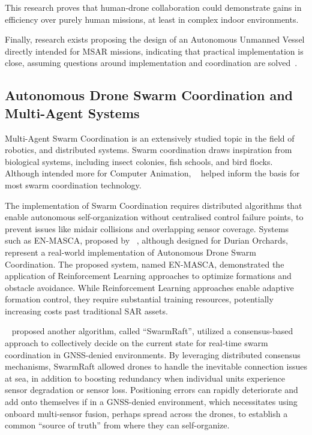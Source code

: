 This research proves that human-drone collaboration could demonstrate gains in efficiency over purely human missions, at least in complex indoor environments.

Finally, research exists proposing the design of an Autonomous Unmanned Vessel directly intended for MSAR missions, indicating that practical implementation is close, assuming questions around implementation and coordination are solved~\cite{AUV_Proposal}.

\subsection{Autonomous Drone Swarm Coordination and Multi-Agent Systems}\label{subsec:autonomous-drone-swarm-coordination-and-multi-agent-systems}
Multi-Agent Swarm Coordination is an extensively studied topic in the field of robotics, and distributed systems.
Swarm coordination draws inspiration from biological systems, including insect colonies, fish schools, and bird flocks.
Although intended more for Computer Animation, ~\cite{10.1145/37402.37406} helped inform the basis for most swarm coordination technology.

The implementation of Swarm Coordination requires distributed algorithms that enable autonomous self-organization without centralised control failure points, to prevent issues like midair collisions and overlapping sensor coverage.
Systems such as EN-MASCA, proposed by ~\cite{ENMASCA2025}, although designed for Durian Orchards, represent a real-world implementation of Autonomous Drone Swarm Coordination.
The proposed system, named EN-MASCA, demonstrated the application of Reinforcement Learning approaches to optimize formations and obstacle avoidance.
While Reinforcement Learning approaches enable adaptive formation control, they require substantial training resources, potentially increasing costs past traditional SAR assets.

~\cite{dev2025swarnraft} proposed another algorithm, called ``SwarmRaft'', utilized a consensus-based approach to collectively decide on the current state for real-time swarm coordination in GNSS-denied environments.
By leveraging distributed consensus mechanisms, SwarmRaft allowed drones to handle the inevitable connection issues at sea, in addition to boosting redundancy when individual units experience sensor degradation or sensor loss.
Positioning errors can rapidly deteriorate and add onto themselves if in a GNSS-denied environment, which necessitates using onboard multi-sensor fusion, perhaps spread across the drones, to establish a common ``source of truth'' from where they can self-organize.

